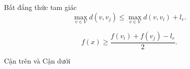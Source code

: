 \IncMargin{1em}
\begin{algorithm}

    \caption{Thuật toán Single-Center.}\label{algo_disjdecomp}
\end{algorithm}
\DecMargin{1em}


\begin{dl}{Bất đẳng thức tam giác}
\begin{equation}
	\max_{v \in V} d(v,v_j) \leq \max_{v \in V} d(v,v_i) + l_e.
\end{equation}
\end{dl}

\begin{dl}
\begin{equation}
	f(x) \geq \frac{f(v_i) + f(v_j) - l_e}{2}.
\end{equation}
\end{dl}

\begin{hq}

\end{hq}

\begin{dl}{Cận trên và Cận dưới}
\end{dl}

